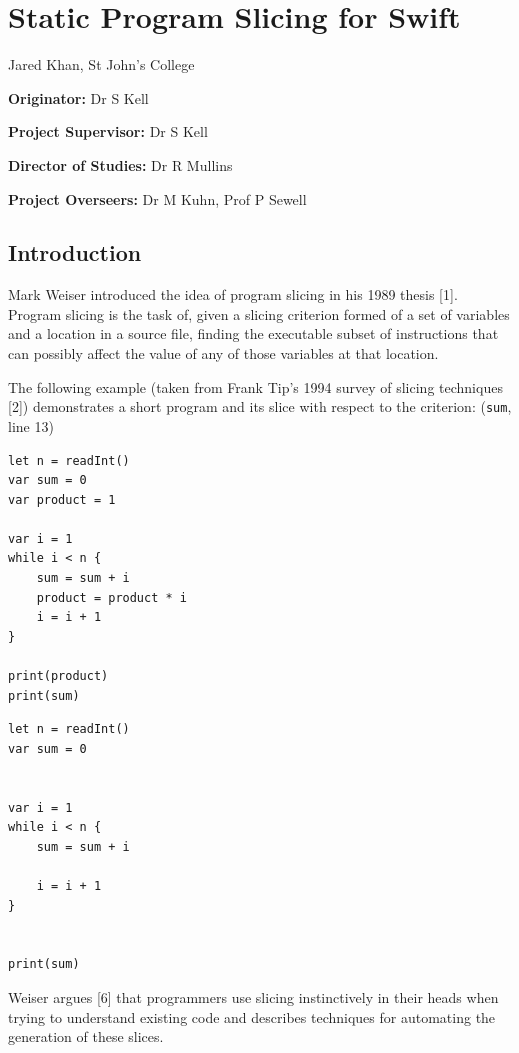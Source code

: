 \section{Static Program Slicing for
Swift}\label{static-program-slicing-for-swift}

Jared Khan, St John's College

\textbf{Originator:} Dr S Kell

\textbf{Project Supervisor:} Dr S Kell

\textbf{Director of Studies:} Dr R Mullins

\textbf{Project Overseers:} Dr M Kuhn, Prof P Sewell

\subsection{Introduction}\label{introduction}

\providecommand{\tightlist}{%
  \setlength{\itemsep}{0pt}\setlength{\parskip}{0pt}}

Mark Weiser introduced the idea of program slicing in his 1989 thesis
{[}1{]}. Program slicing is the task of, given a slicing criterion
formed of a set of variables and a location in a source file, finding
the executable subset of instructions that can possibly affect the value
of any of those variables at that location.

The following example (taken from Frank Tip's 1994 survey of slicing
techniques {[}2{]}) demonstrates a short program and its slice with
respect to the criterion: (\texttt{sum}, line 13)

\begin{verbatim}
let n = readInt()
var sum = 0
var product = 1

var i = 1
while i < n {
    sum = sum + i
    product = product * i
    i = i + 1
}

print(product)
print(sum)
\end{verbatim}

\begin{verbatim}
let n = readInt()
var sum = 0


var i = 1
while i < n {
    sum = sum + i

    i = i + 1
}


print(sum)
\end{verbatim}

Weiser argues {[}6{]} that programmers use slicing instinctively in
their heads when trying to understand existing code and describes
techniques for automating the generation of these slices.

